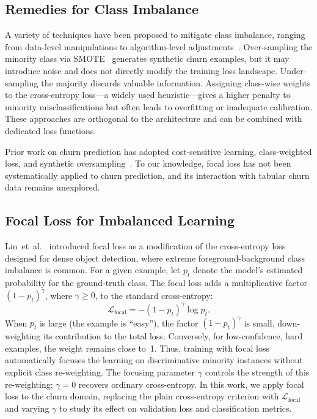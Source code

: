 \documentclass[11pt,a4paper]{article}
\begin{document}
\subsection{Remedies for Class Imbalance}
A variety of techniques have been proposed to mitigate class imbalance, ranging from data-level manipulations to algorithm-level adjustments~\cite{chawla2002smote}. Over-sampling the minority class via SMOTE~\cite{chawla2002smote} generates synthetic churn examples, but it may introduce noise and does not directly modify the training loss landscape. Under-sampling the majority discards valuable information. Assigning class-wise weights to the cross-entropy loss---a widely used heuristic---gives a higher penalty to minority misclassifications but often leads to overfitting or inadequate calibration. These approaches are orthogonal to the architecture and can be combined with dedicated loss functions.

Prior work on churn prediction has adopted cost-sensitive learning, class-weighted loss, and synthetic oversampling~\cite{fatima2024churn}. To our knowledge, focal loss has not been systematically applied to churn prediction, and its interaction with tabular churn data remains unexplored.

\subsection{Focal Loss for Imbalanced Learning}
Lin~et~al.~\cite{lin2017focal} introduced focal loss as a modification of the cross-entropy loss designed for dense object detection, where extreme foreground-background class imbalance is common. For a given example, let $p_t$ denote the model's estimated probability for the ground-truth class. The focal loss adds a multiplicative factor $(1-p_t)^\gamma$, where $\gamma\geq 0$, to the standard cross-entropy:
\[
\mathcal{L}_{\text{focal}} = -(1-p_t)^\gamma \log p_t.
\]
When $p_t$ is large (the example is ``easy''), the factor $(1-p_t)^\gamma$ is small, down-weighting its contribution to the total loss. Conversely, for low-confidence, hard examples, the weight remains close to~1. Thus, training with focal loss automatically focuses the learning on discriminative minority instances without explicit class re-weighting. The focusing parameter $\gamma$ controls the strength of this re-weighting; $\gamma=0$ recovers ordinary cross-entropy. In this work, we apply focal loss to the churn domain, replacing the plain cross-entropy criterion with $\mathcal{L}_{\text{focal}}$ and varying $\gamma$ to study its effect on validation loss and classification metrics.
\end{document}

